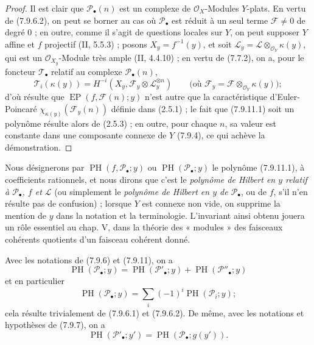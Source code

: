 \begin{proof}
Il est clair que $\mathscr P_\bullet(n)$ est un complexe de
$\mathscr O_X$-Modules $Y$-plats. En vertu de (7.9.6.2), on peut se borner au cas
où $\mathscr P_\bullet$ est réduit à un seul terme $\mathscr F\ne0$ de degré 0 ;
en outre, comme il s'agit de questions locales sur $Y$, on peut supposer $Y$
affine et $f$ projectif (II, 5.5.3) ; posons $X_y=f^{-1}(y)$, et soit
$\mathscr L_y=\mathscr L\otimes_{\mathscr O_Y}\kappa(y)$, qui est un
$\mathscr O_{X_y}$-Module très ample (II, 4.4.10) ; en vertu de (7.7.2), on a,
pour le foncteur $\mathscr T_\bullet$ relatif au complexe
$\mathscr P_\bullet(n)$,
\[
  \mathscr T_i(\kappa(y))
  =H^{-i}(X_y,\mathscr F_y\otimes\mathscr L_y^{\otimes n})
  \qquad
  \bigl(\text{où }\mathscr F_y=\mathscr F\otimes_{\mathscr O_Y}\kappa(y)\bigr) ;
\]
d'où résulte que $\operatorname{EP}(f,\mathscr F(n);y)$ n'est autre que la
caractéristique d'Euler-Poincaré $\chi_{\kappa(y)}(\mathscr F_y(n))$ définie dans
(2.5.1) ; le fait que (7.9.11.1) soit un polynôme résulte alors de (2.5.3) ; en
outre, pour chaque $n$, sa valeur est constante dans une composante connexe de
$Y$ (7.9.4), ce qui achève la démonstration.
\end{proof}

\begin{env}[7.9.12]
\label{III.7.9.12.fr}
Nous désignerons par $\operatorname{PH}(f,\mathscr P_\bullet;y)$ ou
$\operatorname{PH}(\mathscr P_\bullet;y)$ le polynôme (7.9.11.1), à coefficients
rationnels, et nous dirons que c'est le \emph{polynôme de Hilbert en $y$
relatif à $\mathscr P_\bullet$, $f$ et $\mathscr L$} (ou simplement le
\emph{polynôme de Hilbert en $y$ de $\mathscr P_\bullet$}, ou de $f$, s'il n'en
résulte pas de confusion) ; lorsque $Y$ est connexe non vide, on supprime la
mention de $y$ dans la notation et la terminologie. L'invariant ainsi obtenu
jouera un rôle essentiel au chap. V, dans la théorie des « modules » des
faisceaux cohérents quotients d'un faisceau cohérent donné.

Avec les notations de (7.9.6) et (7.9.11), on a
\[
  \operatorname{PH}(\mathscr P_\bullet;y)
  =\operatorname{PH}(\mathscr P'_\bullet;y)
  +\operatorname{PH}(\mathscr P''_\bullet;y)
  \tag{7.9.12.1}\label{III.7.9.12.1.fr}
\]
et en particulier
\[
  \operatorname{PH}(\mathscr P_\bullet;y)
  =\sum_i(-1)^i\operatorname{PH}(\mathscr P_i;y) ;
  \tag{7.9.12.2}\label{III.7.9.12.2.fr}
\]
cela résulte trivialement de (7.9.6.1) et (7.9.6.2). De même, avec les notations
et hypothèses de (7.9.7), on a
\[
  \operatorname{PH}(\mathscr P'_\bullet;y')
  =\operatorname{PH}(\mathscr P_\bullet;g(y')).
  \tag{7.9.12.3}\label{III.7.9.12.3.fr}
\]
\end{env}

